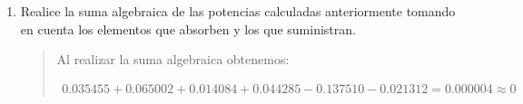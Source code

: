 \documentclass{article}
\begin{document}
\begin{enumerate}[label=\alph*.-]
\begin{quote}
            Por lo que tenemos:
            \[
                \begin{cases}
                    670 I_1 + 330 I_2 &= 8\\
                    330 I_1 + 720 I_2 &= -2
                \end{cases}
            \]

            Al resolverlo obtenemos que:
            \begin{align*}
                I_1 = \SI{0.017189}{\ampere}    \\
                I_2 = \SI{-0.010656}{\ampere}
            \end{align*}

            Ahora, calculamos la potencia usando:
            \[
                P = I^2 R
            \]

            Para las resistencias y:
            \[
                P = IV
            \]

            Para los voltajes, obteniendo:

            \begin{align*}
                P_{R_1} = \SI{0.035455}{\watt}  \\
                P_{R_2} = \SI{0.065002}{\watt}  \\
                P_{R_3} = \SI{0.014084}{\watt}  \\
                P_{R_4} = \SI{0.044285}{\watt}  \\
                P_{V_1} = \SI{-0.137510}{\watt} \\
                P_{V_2} = \SI{-0.021312}{\watt} 
            \end{align*}

        \end{quote}
        
        \item Realice la suma algebraica de las potencias calculadas anteriormente tomando en cuenta los elementos que absorben y los que suministran.
        
        \begin{quote}
            Al realizar la suma algebraica obtenemos:

            \begin{align*}
                0.035455 + 0.065002 + 0.014084 + 0.044285 -0.137510 -0.021312 = 0.000004 \approx 0
            \end{align*}
        \end{quote}
        

\end{enumerate}
\end{document}
